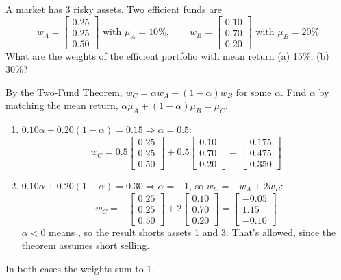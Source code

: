 \begin{example}
    A market has 3 risky assets. Two efficient funds are
    \[w_A = \begin{bmatrix}0.25\\ 0.25\\ 0.50\end{bmatrix} \text{ with } \mu_A = 10\%, \qquad w_B = \begin{bmatrix}0.10\\ 0.70\\ 0.20\end{bmatrix} \text{ with } \mu_B = 20\%\]
    What are the weights of the efficient portfolio with mean return (a) 15\%, (b) 30\%?

    By the Two-Fund Theorem, $w_C = \alpha w_A + (1-\alpha)w_B$ for some $\alpha$. Find $\alpha$ by matching the mean return, $\alpha\mu_A + (1-\alpha)\mu_B = \mu_C$.
    \begin{enumerate}[label=(\alph*)]
        \item $0.10\alpha + 0.20(1-\alpha) = 0.15 \Rightarrow \alpha = 0.5$:
        \[w_C = 0.5\begin{bmatrix}0.25\\ 0.25\\ 0.50\end{bmatrix} + 0.5\begin{bmatrix}0.10\\ 0.70\\ 0.20\end{bmatrix} = \begin{bmatrix}0.175\\ 0.475\\ 0.350\end{bmatrix}\]
        \item $0.10\alpha + 0.20(1-\alpha) = 0.30 \Rightarrow \alpha = -1$, so $w_C = -w_A + 2w_B$:
        \[w_C = -\begin{bmatrix}0.25\\ 0.25\\ 0.50\end{bmatrix} + 2\begin{bmatrix}0.10\\ 0.70\\ 0.20\end{bmatrix} = \begin{bmatrix}-0.05\\ 1.15\\ -0.10\end{bmatrix}\]
        $\alpha < 0$ means , so the result shorts assets 1 and 3. That's allowed, since the theorem assumes short selling.
    \end{enumerate}
    In both cases the weights sum to 1.
\end{example}

